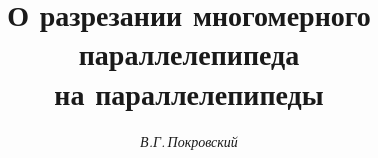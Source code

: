 

 


%


\newcommand{\mr}[1]{\mathrm{#1}}


\newcommand{\tts}[1]{} 


 




\setcounter{page}{69} 












 


\author{\it В.Г.\,Покровский} 




\title{О разрезании многомерного параллелепипеда\\ на параллелепипеды} 


 


\date{} 




\pagestyle{plain} %


 




\maketitle 


\label{begin} 


 


 


